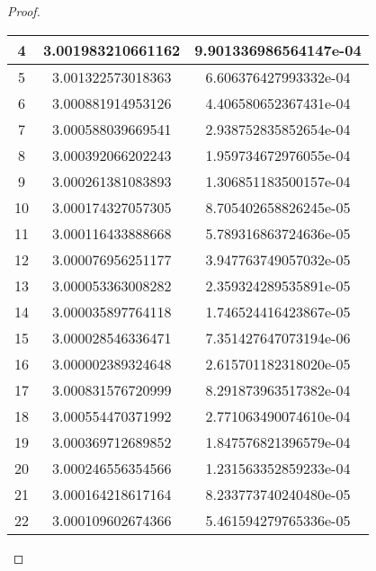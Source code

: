 \begin{enumerate}
\begin{proof}
\begin{table}[H]
\begin{subtable}[t]{.8\textwidth}
\begin{table}[H]
\begin{subtable}[t]{.8\textwidth}
\begin{table}[htbp]
\begin{subtable}[t]{.49\linewidth}
\begin{tabular}{|c|c|c|}
			\footnotesize	4	&	\footnotesize	3.001983210661162	&	\footnotesize	9.901336986564147e-04	\\	\hline
			\footnotesize	5	&	\footnotesize	3.001322573018363	&	\footnotesize	6.606376427993332e-04	\\	\hline
			\footnotesize	6	&	\footnotesize	3.000881914953126	&	\footnotesize	4.406580652367431e-04	\\	\hline
			\footnotesize	7	&	\footnotesize	3.000588039669541	&	\footnotesize	2.938752835852654e-04	\\	\hline
			\footnotesize	8	&	\footnotesize	3.000392066202243	&	\footnotesize	1.959734672976055e-04	\\	\hline
			\footnotesize	9	&	\footnotesize	3.000261381083893	&	\footnotesize	1.306851183500157e-04	\\	\hline
			\footnotesize	10	&	\footnotesize	3.000174327057305	&	\footnotesize	8.705402658826245e-05	\\	\hline
			\footnotesize	11	&	\footnotesize	3.000116433888668	&	\footnotesize	5.789316863724636e-05	\\	\hline
			\footnotesize	12	&	\footnotesize	3.000076956251177	&	\footnotesize	3.947763749057032e-05	\\	\hline
			\footnotesize	13	&	\footnotesize	3.000053363008282	&	\footnotesize	2.359324289535891e-05	\\	\hline
			\footnotesize	14	&	\footnotesize	3.000035897764118	&	\footnotesize	1.746524416423867e-05	\\	\hline
			\footnotesize	15	&	\footnotesize	3.000028546336471	&	\footnotesize	7.351427647073194e-06	\\	\hline
			\footnotesize	16	&	\footnotesize	3.000002389324648	&	\footnotesize	2.615701182318020e-05	\\	\hline
			\footnotesize	17	&	\footnotesize	3.000831576720999	&	\footnotesize	8.291873963517382e-04	\\	\hline
			\footnotesize	18	&	\footnotesize	3.000554470371992	&	\footnotesize	2.771063490074610e-04	\\	\hline
			\footnotesize	19	&	\footnotesize	3.000369712689852	&	\footnotesize	1.847576821396579e-04	\\	\hline
			\footnotesize	20	&	\footnotesize	3.000246556354566	&	\footnotesize	1.231563352859233e-04	\\	\hline
			\footnotesize	21	&	\footnotesize	3.000164218617164	&	\footnotesize	8.233773740240480e-05	\\	\hline
			\footnotesize	22	&	\footnotesize	3.000109602674366	&	\footnotesize	5.461594279765336e-05	\\	\hline

\end{tabular}
\end{subtable}
\end{table}
\end{subtable}
\end{table}
\end{subtable}
\end{table}
\end{proof}
\end{enumerate}
